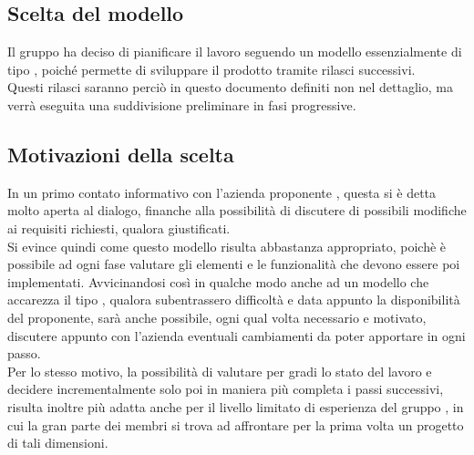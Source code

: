 \subsection{Scelta del modello}   
    Il gruppo \Gruppo{} ha deciso di pianificare il lavoro seguendo un modello essenzialmente di tipo \textbf {}, poiché permette di sviluppare il prodotto tramite rilasci successivi. \\
    Questi rilasci saranno perciò in questo documento definiti non nel dettaglio, ma verrà eseguita una suddivisione preliminare in fasi progressive.

\subsection{Motivazioni della scelta}
    In un primo contato informativo con l'azienda proponente \proponente{}, questa si è detta molto aperta al dialogo, finanche alla possibilità di discutere di possibili modifiche ai requisiti richiesti, qualora giustificati.\\
    Si evince quindi come questo modello risulta abbastanza appropriato, poichè è possibile ad ogni fase valutare gli elementi e le funzionalità che devono essere poi implementati. Avvicinandosi così in qualche modo anche ad un modello che accarezza il tipo , qualora subentrassero difficoltà e data appunto la disponibilità del proponente, sarà anche possibile, ogni qual volta necessario e motivato, discutere appunto con l'azienda \proponente{} eventuali cambiamenti da poter apportare in ogni passo. \\
    Per lo stesso motivo, la possibilità di valutare per gradi lo stato del lavoro e decidere incrementalmente solo poi in maniera più completa i passi successivi, risulta inoltre più adatta anche per il livello limitato di esperienza del gruppo \Gruppo{}, in cui la gran parte dei membri si trova ad affrontare per la prima volta un progetto di tali dimensioni.

